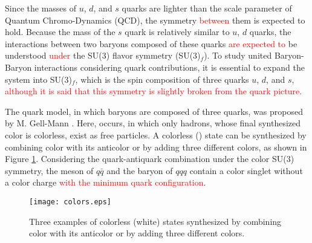 Since the masses of $u$, $d$, and $s$ quarks are lighter than the scale parameter of Quantum Chromo-Dynamics (QCD), the symmetry \textcolor{red}{between} them is expected to hold. Because the mass of the $s$ quark is relatively similar to $u$, $d$ quarks, the interactions between two baryons composed of these quarks \textcolor{red}{are expected to} be understood \textcolor{red}{under} the SU(3) flavor symmetry (SU(3)$_f$). To study united Baryon-Baryon interactions considering quark contributions, it is essential to expand the system into SU(3)$_f$, which is the spin composition of three quarks $u$, $d$, and $s$, \textcolor{red}{although it is said that this symmetry is slightly broken from the quark picture.}

The quark model, in which baryons are composed of three quarks, was proposed by M. Gell-Mann \cite{mgm-1956} \cite{mgm-1961}. %
Here,  occurs, in which only hadrons, whose final synthesized color is colorless, exist as free particles. A colorless () state can be synthesized by combining color with its anticolor or by adding three different colors, as shown in Figure \ref{fig-colors}. Considering the quark-antiquark combination under the color SU(3) symmetry, the meson of $q\bar{q}$ and the baryon of $qqq$ contain a color singlet without a color charge \textcolor{red}{with the minimum quark configuration}.
\begin{figure}[h!]
  \begin{center}
  \texttt{[image: colors.eps]}
  \caption{Three examples of colorless (white) states synthesized by combining color with its anticolor or by adding three different colors.}
  \label{fig-colors}
  \end{center}
\end{figure}

